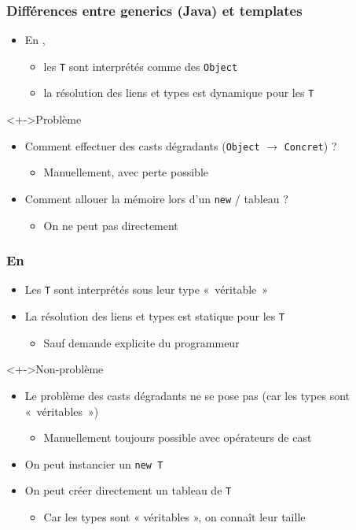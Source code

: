 \begin{frame}
\frametitle{Différences entre generics (Java) et templates}
\begin{itemize}[<+->]
\item En \java, 
	\begin{itemize}
	\item les \texttt{T} sont interprétés comme des \texttt{Object}
	\item la résolution des liens et types est dynamique pour les \texttt{T}
	\end{itemize}
\end{itemize}
\begin{alertblock}<+->{Problème}
	\begin{itemize}[<+->]
	\item Comment effectuer des casts dégradants (\texttt{Object} $\longrightarrow$ \texttt{Concret}) ?
		\begin{itemize}
		\item Manuellement, avec perte possible
		\end{itemize}
	\item Comment allouer la mémoire lors d'un \lstinline|new| / tableau ?
		\begin{itemize}
		\item On ne peut pas directement
		\end{itemize}
	\end{itemize}	
\end{alertblock}
\end{frame}

\begin{frame}
\frametitle{En \cpp}
\begin{itemize}[<+->]
\item Les \texttt{T} sont interprétés sous leur type «~véritable~»
\item La résolution des liens et types est statique pour les \texttt{T}
	\begin{itemize}
	\item Sauf demande explicite du programmeur
	\end{itemize}
\end{itemize}
\begin{exampleblock}<+->{Non-problème}
	\begin{itemize}[<+->]
	\item Le problème des casts dégradants ne se pose pas (car les types sont «~véritables~»)
		\begin{itemize}
		\item Manuellement toujours possible avec opérateurs de cast
		\end{itemize}
	\item On peut instancier un \lstinline|new T|
	\item On peut créer directement un tableau de \texttt{T}
		\begin{itemize}
		\item Car les types sont « véritables », on connaît leur taille
		\end{itemize}
	\end{itemize}
\end{exampleblock}
\end{frame}

